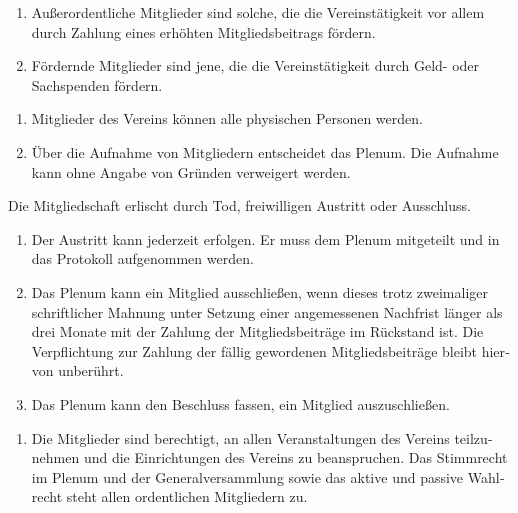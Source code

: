 \begin{otherlanguage}{german}
\begin{enumerate}[statutenenum]
    \item Außerordentliche Mitglieder sind solche, die die Vereinstätigkeit vor allem durch Zahlung eines erhöhten Mitgliedsbeitrags fördern.

    \item Fördernde Mitglieder sind jene, die die Vereinstätigkeit durch Geld- oder Sachspenden fördern.
\end{enumerate}


\begin{enumerate}[statutenenum]
    \item Mitglieder des Vereins können alle physischen Personen werden.

    \item Über die Aufnahme von Mitgliedern entscheidet das Plenum.
        Die Aufnahme kann ohne Angabe von Gründen verweigert werden.
\end{enumerate}


Die Mitgliedschaft erlischt durch Tod, freiwilligen Austritt oder Ausschluss.

\begin{enumerate}[statutenenum]
    \item Der Austritt kann jederzeit erfolgen.
        Er muss dem Plenum mitgeteilt und in das Protokoll aufgenommen werden.

    \item Das Plenum kann ein Mitglied ausschließen, wenn dieses trotz zweimaliger schriftlicher Mahnung unter Setzung einer angemessenen Nachfrist länger als drei Monate mit der Zahlung der Mitgliedsbeiträge im Rückstand ist.
        Die Verpflichtung zur Zahlung der fällig gewordenen Mitgliedsbeiträge bleibt hiervon unberührt.

    \item Das Plenum kann den Beschluss fassen, ein Mitglied auszuschließen.
\end{enumerate}


\begin{enumerate}[statutenenum]
    \item Die Mitglieder sind berechtigt, an allen Veranstaltungen des Vereins teilzunehmen und die Einrichtungen des Vereins zu beanspruchen.
        Das Stimmrecht im Plenum und der Generalversammlung sowie das aktive und passive Wahlrecht steht allen ordentlichen Mitgliedern zu.


\end{enumerate}
\end{otherlanguage}
